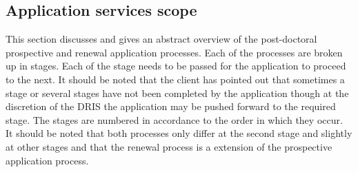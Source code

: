 \documentclass[12pt]{article}
\begin{document}
\newpage
\subsection{Application services scope}
This section discusses and gives an abstract overview of the post-doctoral prospective and renewal application processes. Each of the processes are broken up in stages. Each of the stage needs to be passed for the application to proceed to the next. It should be noted that the client has pointed out that sometimes a stage or several stages have not been completed by the application though at the discretion of the DRIS the application may be pushed forward to the required stage. The stages are numbered in accordance to the order in which they occur. It should be noted that both processes only differ at the second stage and slightly at other stages and that the renewal process is a extension of the prospective application process.
\end{document}
